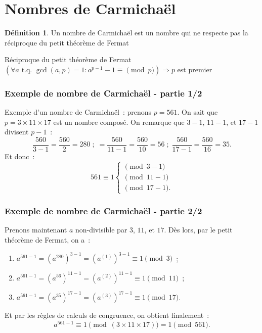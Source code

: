 \documentclass[10pt, mathserif]{beamer}
\newcommand{\tq}{\text{ t.q. }}
\theoremstyle{definition}
\newtheorem{déf}[thm]{Définition}
\theoremstyle{remark}
\begin{document}
\section{Nombres de Carmichaël}
	\begin{frame}
		\begin{déf}
			Un nombre de Carmichaël est un nombre  qui ne respecte pas la réciproque du petit théorème de Fermat
		\end{déf}

		\begin{block}{Réciproque du petit théorème de Fermat}
			$\left(\forall a \tq \gcd(a, p) = 1 : a^{p-1}-1 \equiv \pmod p\right) \Rightarrow p$ est premier
		\end{block}
	\end{frame}

	\begin{frame}
		\frametitle{Exemple de nombre de Carmichaël - partie 1/2}
		Exemple d'un nombre de Carmichaël~: prenons $p = 561$. On sait que $p = 3 \times 11 \times 17$ est un nombre composé. On remarque que $3-1$, $11-1$,
		et $17-1$ divisent $p-1$~:
		\[\frac {560}{3-1} = \frac {560}2 = 280 \;;\; = \frac {560}{11-1} = \frac {560}{10} = 56 \;;\; \frac {560}{17-1} = \frac {560}{16} = 35.\]
		Et donc~:
		\[561 \equiv 1 \begin{cases}\pmod {3-1} \\ \pmod {11-1} \\ \pmod {17-1}.\end{cases}\]
	\end{frame}

	\begin{frame}
		\frametitle{Exemple de nombre de Carmichaël - partie 2/2}
		Prenons maintenant $a$ non-divisible par $3$, $11$, et $17$. Dès lors, par le petit théorème de Fermat, on a~:
		\begin{enumerate}
			\item $a^{561-1} = \left(a^{280}\right)^{3-1} = (a^{(1)})^{3 -1} \equiv 1 \pmod {3}$~;
			\item $a^{561-1} = \left(a^{56}\right)^{11-1} = (a^{(2)})^{11-1} \equiv 1 \pmod {11}$~;
			\item $a^{561-1} = \left(a^{35}\right)^{17-1} = (a^{(3)})^{17-1} \equiv 1 \pmod {17}$.
		\end{enumerate}

		Et par les règles de calculs de congruence, on obtient finalement~:
		\[a^{561-1} \equiv 1 \pmod {(3 \times 11 \times 17)} = 1 \pmod {561}.\]
	\end{frame}
\end{document}
